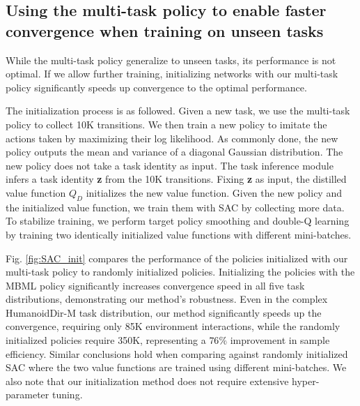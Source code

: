 \subsection{Using the multi-task policy to enable faster convergence when training on unseen tasks}\label{sec_exp_init_sac}

While the multi-task policy generalize to unseen tasks, its performance is not optimal. If we allow further training,
initializing networks with our multi-task policy significantly speeds up convergence to the optimal performance.

The initialization process is as followed. Given a new task, we use the multi-task policy to collect 10K transitions.
We then train a new policy to imitate the actions taken by maximizing their log likelihood. As commonly done, the new policy outputs the mean and variance of a diagonal Gaussian distribution. The new policy does not take a task identity as input. The task inference module infers a task identity {\bf z} from the 10K transitions. Fixing {\bf z} as input, the distilled value function $Q_D$ initializes the new value function. Given the new policy and the initialized value function,
we train them with SAC by collecting more data.
To stabilize training, we perform target policy smoothing \cite{TD3} and double-Q learning \cite{van2016deep} by training two identically initialized value functions with different mini-batches.

Fig. \ref{fig:SAC_init} compares the performance of the policies initialized with our multi-task policy to randomly initialized policies.
Initializing the policies with the MBML policy significantly increases convergence speed in all five task distributions, demonstrating our method's robustness.
Even in the complex HumanoidDir-M task distribution, our method significantly speeds up the convergence, requiring only 85K environment interactions, while the randomly initialized policies require 350K, representing a $76\%$ improvement in sample efficiency.
Similar conclusions hold when comparing against randomly initialized SAC where the two value functions are trained using different mini-batches.
We also note that our initialization method does not require extensive hyper-parameter tuning.


